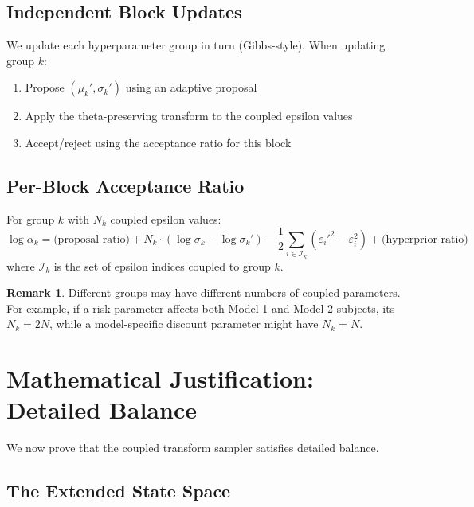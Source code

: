 \documentclass[11pt,a4paper]{article}
\theoremstyle{definition}
\newtheorem{remark}[theorem]{Remark}
\newcommand{\eps}{\varepsilon}
\begin{document}
\subsection{Independent Block Updates}

We update each hyperparameter group in turn (Gibbs-style). When updating group $k$:
\begin{enumerate}
    \item Propose $(\mu_k', \sigma_k')$ using an adaptive proposal
    \item Apply the theta-preserving transform to the coupled epsilon values
    \item Accept/reject using the acceptance ratio for this block
\end{enumerate}

\subsection{Per-Block Acceptance Ratio}

For group $k$ with $N_k$ coupled epsilon values:
\begin{equation}
    \log \alpha_k = \text{(proposal ratio)} + N_k \cdot (\log \sigma_k - \log \sigma_k')
    - \frac{1}{2}\sum_{i \in \mathcal{I}_k} (\eps_i'^2 - \eps_i^2) + \text{(hyperprior ratio)}
\end{equation}
where $\mathcal{I}_k$ is the set of epsilon indices coupled to group $k$.

\begin{remark}
Different groups may have different numbers of coupled parameters. For example,
if a risk parameter affects both Model 1 and Model 2 subjects, its $N_k = 2N$,
while a model-specific discount parameter might have $N_k = N$.
\end{remark}

\section{Mathematical Justification: Detailed Balance}
\label{sec:detailed_balance}

We now prove that the coupled transform sampler satisfies detailed balance.

\subsection{The Extended State Space}
\end{document}
